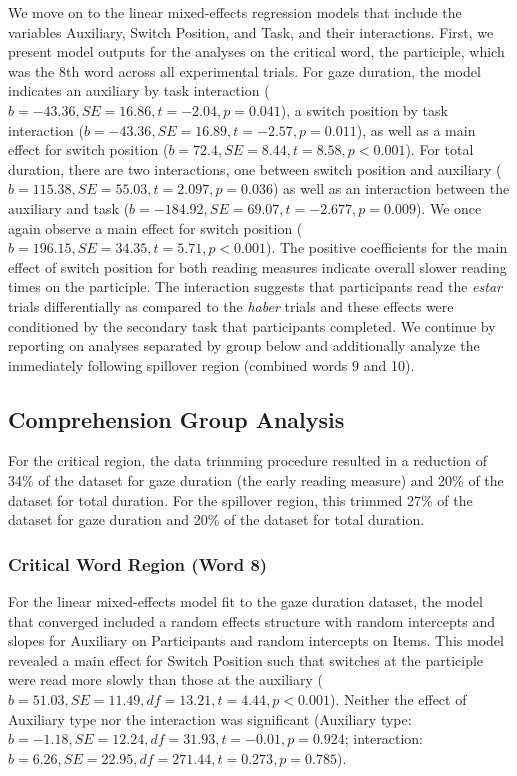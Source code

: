 \documentclass[output=paper,colorlinks,citecolor=brown]{langscibook}
\begin{document}
We move on to the linear mixed-effects regression models that include the variables Auxiliary, Switch Position, and Task, and their interactions. First, we present model outputs for the analyses on the critical word, the participle, which was the 8th word across all experimental trials. For gaze duration, the model indicates an auxiliary by task interaction ($b = -43.36, SE = 16.86, t = -2.04, p = 0.041$), a switch position by task interaction ($b = -43.36, SE = 16.89, t = -2.57, p = 0.011$),  as well as a main effect for switch position ($b = 72.4, SE = 8.44, t = 8.58, p < 0.001$). For total duration, there are two interactions, one between switch position and auxiliary ($b = 115.38, SE = 55.03, t = 2.097, p = 0.036$) as well as an interaction between the auxiliary and task ($b = -184.92, SE = 69.07, t = -2.677, p = 0.009$). We once again observe a main effect for switch position ($b = 196.15, SE = 34.35, t = 5.71, p < 0.001$). The positive coefficients for the main effect of switch position for both reading measures indicate overall slower reading times on the participle. The interaction suggests that participants read the \textit{estar} trials differentially as compared to the \textit{haber} trials and these effects were conditioned by the secondary task that participants completed. We continue by reporting on analyses separated by group below and additionally analyze the immediately following spillover region (combined words 9 and 10).

\subsection{Comprehension Group Analysis}
For the critical region, the data trimming procedure resulted in a reduction of 34\% of the dataset for gaze duration (the early reading measure) and 20\% of the dataset for total duration. For the spillover region, this trimmed 27\% of the dataset for gaze duration and 20\% of the dataset for total duration.

\subsubsection{Critical Word Region (Word 8)}
For the linear mixed-effects model fit to the gaze duration dataset, the model that converged included a random effects structure with random intercepts and slopes for Auxiliary on Participants and random intercepts on Items. This model revealed a main effect for Switch Position such that switches at the participle were read more slowly than those at the auxiliary ($b = 51.03, SE = 11.49, df = 13.21, t = 4.44, p < 0.001$). Neither the effect of Auxiliary type nor the interaction was significant (Auxiliary type: $b = -1.18, SE = 12.24, df = 31.93, t = -0.01, p = 0.924$; interaction: $b = 6.26, SE = 22.95, df = 271.44, t = 0.273, p = 0.785$).
\end{document}
